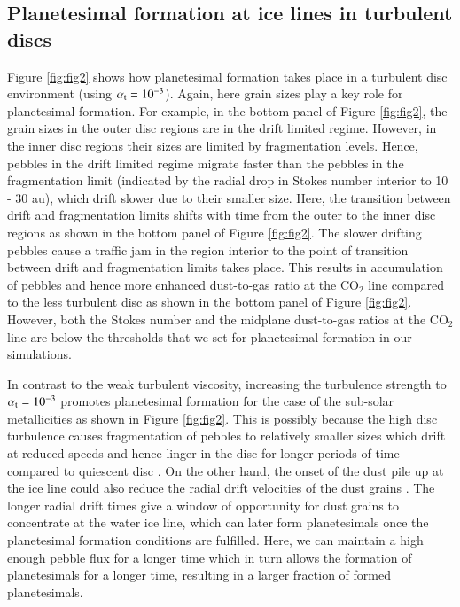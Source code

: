 \documentclass{aa}
\begin{document}
\subsection{Planetesimal formation at ice lines in turbulent discs}
 
Figure \ref{fig:fig2} shows how  planetesimal formation takes place in a turbulent disc environment (using $\alpha_{\rm t}=10^{-3}$). Again, here grain sizes play a key role for planetesimal formation. For example, in the bottom panel of Figure \ref{fig:fig2}, the grain sizes in the outer disc regions are in the drift limited regime. However, in the inner disc regions their sizes are limited by fragmentation levels. Hence, pebbles in the drift limited regime migrate  faster than the pebbles in the fragmentation limit (indicated by the radial drop in Stokes number interior to 10 - 30 au), which drift slower due to their smaller size. Here, the transition between drift and fragmentation limits shifts with time from the outer to the inner disc regions as shown in the bottom panel of Figure \ref{fig:fig2}. The slower drifting pebbles cause a traffic jam in the region interior to the point of transition between drift and fragmentation limits takes place. This results in accumulation of pebbles and hence more enhanced dust-to-gas ratio at the CO$_2$ line compared to the less turbulent disc as shown in the bottom panel of Figure \ref{fig:fig2}. However, both the Stokes number and the midplane dust-to-gas ratios at the  CO$_2$ line are below the thresholds that we set for planetesimal formation in our simulations.

In contrast to the weak turbulent viscosity, increasing the turbulence strength to $\alpha_{\rm t}=10^{-3}$ promotes planetesimal formation for the case of the sub-solar metallicities as shown in Figure \ref{fig:fig2}.
This is possibly because the high disc turbulence causes fragmentation of pebbles to relatively smaller sizes which drift at reduced speeds and hence linger in the disc for longer periods of time compared to quiescent disc \citep[see also][]{BitschMah2023}. On the other hand, the onset of the dust pile up at the ice line could also reduce the radial drift velocities of the dust grains \citep{Drazkowska2016}. The longer radial drift times give a window of opportunity for dust grains to concentrate at the water ice line, which can later form planetesimals once the planetesimal formation conditions are fulfilled. Here, we can maintain a high enough pebble flux for a longer time which in turn allows the formation of planetesimals for a longer time, resulting in a larger fraction of formed planetesimals.
\end{document}
